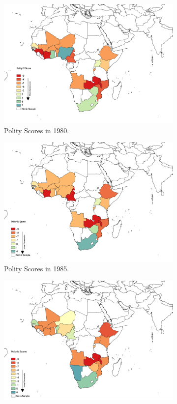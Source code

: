 \documentclass{wptemp}
\begin{document}
\begin{figure}[!htb]
\centering
\caption{Democracy in sample countries from 1980 to 2000.}
\label{fig1}
\begin{subfigure}{.48\textwidth}
\centering
\includegraphics[width=.9\linewidth]{1980.png}
\caption{Polity Scores in 1980.}
\label{fig1980}
\end{subfigure}
\centering
\begin{subfigure}{.48\textwidth}
\centering
\includegraphics[width=.9\linewidth]{1985.png}
\caption{Polity Scores in 1985.}
\label{fig1985}
\end{subfigure}
\begin{subfigure}{.48\textwidth}
\centering
\includegraphics[width=.9\linewidth]{1990.png}

\end{subfigure}
\end{figure}
\end{document}
